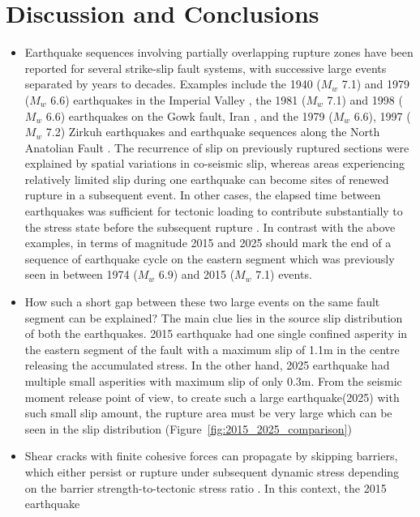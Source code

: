 \section{Discussion and Conclusions}
\begin{itemize}
    \item Earthquake sequences involving partially overlapping rupture zones have been reported for several
     strike-slip fault systems, with successive large events separated by years to decades. Examples include
    the 1940 (\(M_w\) 7.1) and 1979 (\(M_w\) 6.6) earthquakes in the Imperial Valley \cite{discussion2013}, 
    the 1981 (\(M_w\) 7.1) and 1998 (\(M_w\) 6.6) earthquakes on the Gowk fault,
    Iran \cite{gowk2010}, and the 1979 (\(M_w\) 6.6), 1997 (\(M_w\) 7.2) Zirkuh earthquakes
     \cite{berberian1999} and earthquake sequences along the North Anatolian Fault \cite{barka1996}. 
     The recurrence of slip on previously ruptured sections were explained by spatial variations in co-seismic slip,
      whereas areas experiencing relatively limited slip during one
     earthquake can become sites of renewed rupture in a subsequent event. In other cases, the elapsed time between
    earthquakes was sufficient for tectonic loading to contribute substantially to the stress state
    before the subsequent rupture \cite{king1998}. 
    In contrast with the above examples, in terms of magnitude 2015 and 2025 should mark the end of a sequence of earthquake 
    cycle on the eastern segment which was previously seen in between 1974 (\(M_w\) 6.9) and 2015 (\(M_w\) 7.1) events. 
    \item How such a short gap between these two large events on the same fault segment can be explained? The main clue lies in the 
    source slip distribution of both the earthquakes. 2015 earthquake had one single confined asperity in the eastern segment of the fault
    with a maximum slip of 1.1m in the centre releasing the accumulated stress. In the other hand, 2025 earthquake had multiple small
    asperities with maximum slip of only 0.3m. From the seismic moment release point of view, to create such a large earthquake(2025)
    with such small slip amount, the rupture area must be very large which can be seen in the slip distribution (Figure~\ref{fig:2015_2025_comparison})
    \item Shear cracks with finite cohesive forces can propagate by skipping barriers, which either persist or rupture under subsequent
     dynamic stress \cite{heaton1990} depending on the barrier strength-to-tectonic stress ratio \cite{das1977}. In this context, the 2015 earthquake 

\end{itemize}
